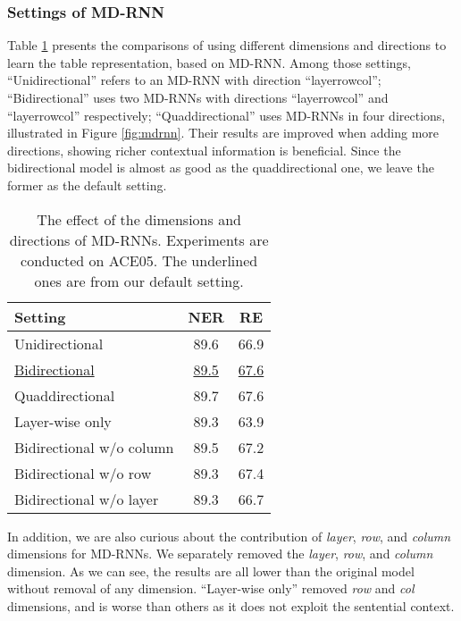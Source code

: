 \documentclass[11pt,a4paper]{article}
\begin{document}
\subsubsection{Settings of MD-RNN}

Table \ref{tab:encoder_new} presents the comparisons of using different dimensions and directions to learn the table representation, based on MD-RNN.
Among those settings,
``Unidirectional'' refers to an MD-RNN with direction ``layerrowcol'';
``Bidirectional'' uses two MD-RNNs with directions ``layerrowcol'' and ``layerrowcol'' respectively;
``Quaddirectional'' uses MD-RNNs in four directions, illustrated in Figure \ref{fig:mdrnn}.
Their results are improved when adding more directions, showing richer contextual information is beneficial.
Since the bidirectional model is almost as good as the quaddirectional one, we leave the former as the default setting.

\begin{table}[t]
\centering
\scalebox{0.82}
{
\begin{tabular}{lcc}
\toprule
Setting             & NER    & RE        \\ \midrule
Unidirectional
                    & 89.6   & 66.9      \\
\underline{Bidirectional}
                    & \underline{89.5}   & \underline{67.6}      \\
Quaddirectional
                    & 89.7   & 67.6      \\
Layer-wise only
                    & 89.3   & 63.9      \\
Bidirectional w/o column
                    & 89.5   & 67.2      \\
Bidirectional w/o row
                    & 89.3   & 67.4      \\
Bidirectional w/o layer
                    & 89.3   & 66.7  \\
\bottomrule
\end{tabular}
}
\caption{
    The effect of the dimensions and directions of MD-RNNs.
    Experiments are conducted on ACE05.
    The underlined ones are from our default setting.
}
\label{tab:encoder_new}
\end{table}

In addition, we are also curious about the contribution of \emph{layer}, \emph{row}, and \emph{column} dimensions for MD-RNNs.
We separately removed the \emph{layer}, \emph{row}, and \emph{column} dimension. As we can see, the results are all lower than the original model without removal of any dimension.
``Layer-wise only'' removed \emph{row} and \emph{col} dimensions, and is worse than others as it does not exploit the sentential context.
\end{document}
